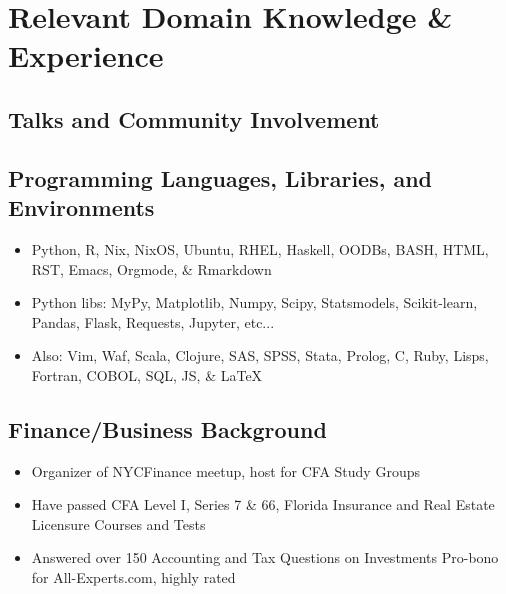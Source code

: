 \documentclass[letterpaper,10pt]{article}
\date{05/27/2020}
\newcommand{\sbullet}{%
  \texorpdfstring{\textsbullet}{\textbullet}%
}
\DeclareRobustCommand{\textsbullet}{%
  \unskip~\,\begin{picture}(1,1)(0,-3)\circle*{3}\end{picture}\ %
}
\newcommand{\cvsection}[1]{\section{#1}}
\newcommand{\cvsubsection}[3]{%
  \subsection{\textbf{#1} #2\texorpdfstring{\hfill}{ }#3}%
}
\begin{document}
\cvsection{Relevant Domain Knowledge \& Experience}

\cvsubsection{Talks and Community Involvement}{}{}

\cvsubsection{Programming Languages, Libraries, and Environments}{}{}
\begin{itemize}
  \item Python, R, Nix, NixOS, Ubuntu, RHEL, Haskell, OODBs, BASH, HTML, RST, Emacs, Orgmode, \& Rmarkdown
  \item Python libs: MyPy, Matplotlib, Numpy, Scipy, Statsmodels, Scikit-learn, Pandas, Flask, Requests, Jupyter, etc...
  \item Also: Vim, Waf, Scala, Clojure, SAS, SPSS, Stata, Prolog, C, Ruby,
    Lisps, Fortran, COBOL, SQL, JS, \& \LaTeX  
\end{itemize}

\cvsubsection{Finance/Business Background}{}{}
\begin{itemize}
  \item Organizer of NYCFinance meetup, host for CFA Study Groups
  \item Have passed CFA Level I, Series 7 \& 66, Florida Insurance and Real Estate Licensure Courses and Tests
  \item Answered over 150 Accounting and Tax Questions on Investments Pro-bono for All-Experts.com, highly rated
\end{itemize}
\end{document}
